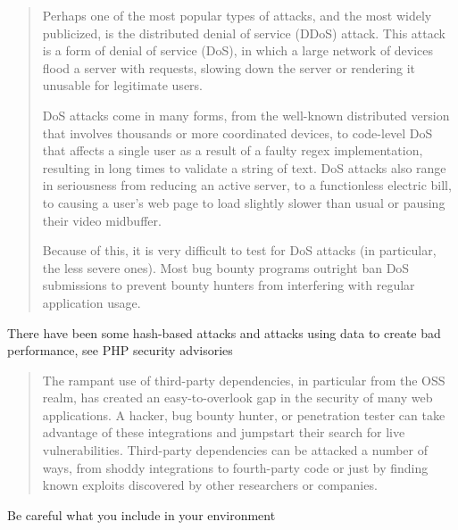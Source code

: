 \documentclass[Screen16to9,17pt]{foils}
\newcommand{\quotesize}{\fontsize{16pt}{20pt}\selectfont}
\begin{document}
\begin{quote}\quotesize
Perhaps one of the most popular types of attacks, and the most widely publicized, is the distributed denial of service (DDoS) attack. This attack is a form of denial of service (DoS), in which a large network of devices flood a server with requests, slowing down the server or rendering it unusable for legitimate users.

DoS attacks come in many forms, from the well-known distributed version that involves thousands or more coordinated devices, to code-level DoS that affects a single user as a result of a faulty regex implementation, resulting in long times to validate a string of text. DoS attacks also range in seriousness from reducing an active server, to a functionless electric bill, to causing a user’s web page to load slightly slower than usual or pausing their video midbuffer.

Because of this, it is very difficult to test for DoS attacks (in particular, the less severe
ones). Most bug bounty programs outright ban DoS submissions to prevent bounty
hunters from interfering with regular application usage.
\end{quote}

\begin{list2}
\item There have been some hash-based attacks and attacks using data to create bad performance, see PHP security advisories
\end{list2}


\begin{quote}\quotesize
The rampant use of third-party dependencies, in particular from the OSS realm, has created an easy-to-overlook gap in the security of many web applications. A hacker, bug bounty hunter, or penetration tester can take advantage of these integrations and jumpstart their search for live vulnerabilities. Third-party dependencies can be attacked a number of ways, from shoddy integrations to fourth-party code or just by finding known exploits discovered by other researchers or companies.
\end{quote}

\begin{list2}
  \item Be careful what you include in your environment
\end{list2}


\end{document}
